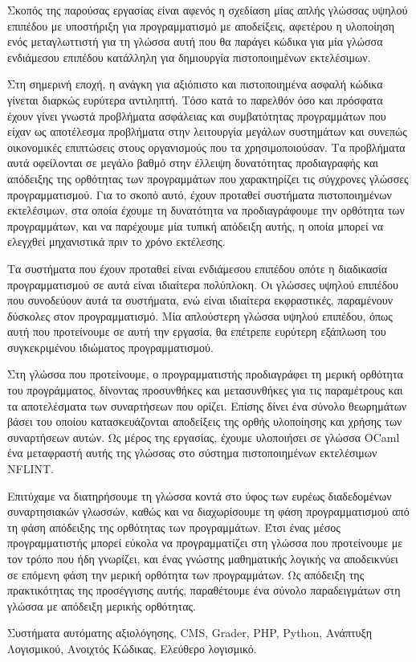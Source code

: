 \documentclass[diploma]{softlab-thesis}
\begin{document}
\begin{abstractgr}%
  Σκοπός της παρούσας εργασίας είναι αφενός η σχεδίαση μίας απλής
  γλώσσας υψηλού επιπέδου με υποστήριξη για προγραμματισμό με
  αποδείξεις, αφετέρου η υλοποίηση ενός μεταγλωττιστή για τη γλώσσα
  αυτή που θα παράγει κώδικα για μία γλώσσα ενδιάμεσου επιπέδου
  κατάλληλη για δημιουργία πιστοποιημένων εκτελέσιμων.

  Στη σημερινή εποχή, η ανάγκη για αξιόπιστο και πιστοποιημένα ασφαλή
  κώδικα γίνεται διαρκώς ευρύτερα αντιληπτή. Τόσο κατά το παρελθόν όσο
  και πρόσφατα έχουν γίνει γνωστά προβλήματα ασφάλειας και
  συμβατότητας προγραμμάτων που είχαν ως αποτέλεσμα προβλήματα στην
  λειτουργία μεγάλων συστημάτων και συνεπώς οικονομικές επιπτώσεις
  στους οργανισμούς που τα χρησιμοποιούσαν. Τα προβλήματα αυτά
  οφείλονται σε μεγάλο βαθμό στην έλλειψη δυνατότητας προδιαγραφής και
  απόδειξης της ορθότητας των προγραμμάτων που χαρακτηρίζει τις
  σύγχρονες γλώσσες προγραμματισμού. Για το σκοπό αυτό, έχουν προταθεί
  συστήματα πιστοποιημένων εκτελέσιμων, στα οποία έχουμε τη δυνατότητα
  να προδιαγράφουμε την ορθότητα των προγραμμάτων, και να παρέχουμε
  μία τυπική απόδειξη αυτής, η οποία μπορεί να ελεγχθεί μηχανιστικά
  πριν το χρόνο εκτέλεσης.

  Τα συστήματα που έχουν προταθεί είναι ενδιάμεσου επιπέδου οπότε η
  διαδικασία προγραμματισμού σε αυτά είναι ιδιαίτερα πολύπλοκη. Οι
  γλώσσες υψηλού επιπέδου που συνοδεύουν αυτά τα συστήματα, ενώ είναι
  ιδιαίτερα εκφραστικές, παραμένουν δύσκολες στον προγραμματισμό. Μία
  απλούστερη γλώσσα υψηλού επιπέδου, όπως αυτή που προτείνουμε σε αυτή
  την εργασία, θα επέτρεπε ευρύτερη εξάπλωση του συγκεκριμένου
  ιδιώματος προγραμματισμού.

  Στη γλώσσα που προτείνουμε, ο προγραμματιστής προδιαγράφει τη μερική
  ορθότητα του προγράμματος, δίνοντας προσυνθήκες και μετασυνθήκες για
  τις παραμέτρους και τα αποτελέσματα των συναρτήσεων που ορίζει.
  Επίσης δίνει ένα σύνολο θεωρημάτων βάσει του οποίου κατασκευάζονται
  αποδείξεις της ορθής υλοποίησης και χρήσης των συναρτήσεων αυτών. Ως
  μέρος της εργασίας, έχουμε υλοποιήσει σε γλώσσα OCaml ένα
  μεταφραστή αυτής της γλώσσας στο σύστημα πιστοποιημένων
  εκτελέσιμων NFLINT.

  Επιτύχαμε να διατηρήσουμε τη γλώσσα κοντά στο ύφος των ευρέως
  διαδεδομένων συναρτησιακών γλωσσών, καθώς και να διαχωρίσουμε τη
  φάση προγραμματισμού από τη φάση απόδειξης της ορθότητας των
  προγραμμάτων. Έτσι ένας μέσος προγραμματιστής μπορεί εύκολα να
  προγραμματίζει στη γλώσσα που προτείνουμε με τον τρόπο που ήδη
  γνωρίζει, και ένας γνώστης μαθηματικής λογικής να αποδεικνύει σε
  επόμενη φάση την μερική ορθότητα των προγραμμάτων. Ως απόδειξη της
  πρακτικότητας της προσέγγισης αυτής, παραθέτουμε ένα σύνολο
  παραδειγμάτων στη γλώσσα με απόδειξη μερικής ορθότητας.

\begin{keywordsgr}
Συστήματα αυτόματης αξιολόγησης, CMS, Grader, PHP, Python, Ανάπτυξη Λογισμικού,
Ανοιχτός Κώδικας, Ελεύθερο λογισμικό.
\end{keywordsgr}
\end{abstractgr}
\end{document}
